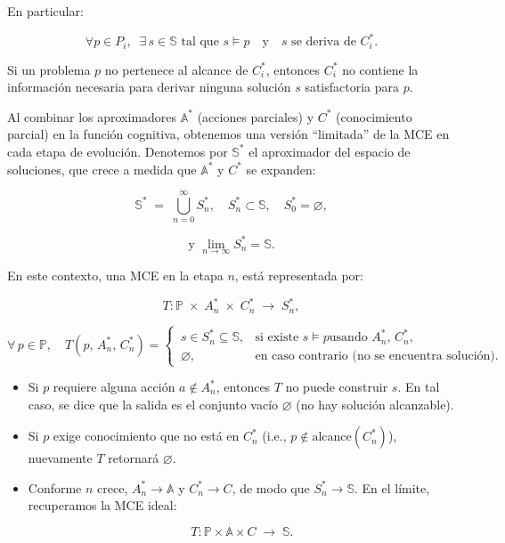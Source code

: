 En particular:

\begin{equation}
 \forall p \in P_i,\;\; \exists\,s \in \mathbb{S} \text{ tal que } s \models p 
 \quad\text{y}\quad s \text{ se deriva de } C_i^*.
\end{equation}

Si un problema \(p\) no pertenece al alcance de \(C_i^*\), entonces \(C_i^*\) no
contiene la información necesaria para derivar ninguna solución \(s\)
satisfactoria para \(p\).


Al combinar los aproximadores \(\mathbb{A}^*\) (acciones parciales) y \(C^*\)
(conocimiento parcial) en la función cognitiva, obtenemos una versión “limitada”
de la MCE en cada etapa de evolución. Denotemos por \(\mathbb{S}^*\) el
aproximador del espacio de soluciones, que crece a medida que \(\mathbb{A}^*\) y
\(C^*\) se expanden:

\begin{equation}
 \mathbb{S}^* \;=\; \bigcup_{n=0}^\infty S_n^*, 
 \quad 
 S_n^* \subset
\mathbb{S}, 
 \quad
 S_0^* = \varnothing,
\end{equation}

\begin{equation}
 \text{y } \lim_{n \to \infty} S_n^* = \mathbb{S}.
\end{equation}

En este contexto, una MCE en la etapa \(n\), está representada por:

\begin{equation}
 T: \mathbb{P} \;\times\; A_n^* \;\times\; C_n^* \;\longrightarrow\; S_n^*,
\end{equation}

\begin{equation}
 \forall\,p \in \mathbb{P},\quad T(p,\,A_n^*,\,C_n^*) = 
 \begin{cases}
\,s \in S_n^* \subseteq \mathbb{S}, & \text{si existe } s \models p \text{
usando } A_n^*,\,C_n^*,\\
 \,\varnothing, & \text{en caso contrario (no se
encuentra solución).}
 \end{cases}
\end{equation}

\begin{itemize}
 \item Si \(p\) requiere alguna acción \(a \notin A_n^*\),
entonces \(T\) no puede construir \(s\). En tal caso, se dice que la salida es
el conjunto vacío \(\varnothing\) (no hay solución alcanzable).
 \item Si \(p\)
exige conocimiento que no está en \(C_n^*\) (i.e., \(p \notin
\mathrm{alcance}(C_n^*)\)), nuevamente \(T\) retornará \(\varnothing\).
 \item
Conforme \(n\) crece, \(A_n^* \to \mathbb{A}\) y \(C_n^* \to C\), de modo que
\(S_n^* \to \mathbb{S}\). En el límite, recuperamos la MCE ideal:

\begin{equation}
 T: \mathbb{P} \times \mathbb{A} \times C \;\longrightarrow\; \mathbb{S}.
\end{equation}

\end{itemize}

